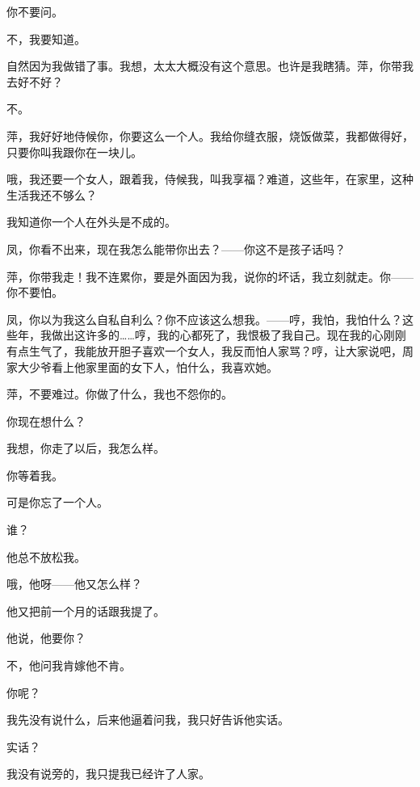 你不要问。

不，我要知道。

自然因为我做错了事。我想，太太大概没有这个意思。也许是我瞎猜。萍，你带我去好不好？

不。

萍，我好好地侍候你，你要这么一个人。我给你缝衣服，烧饭做菜，我都做得好，只要你叫我跟你在一块儿。

哦，我还要一个女人，跟着我，侍候我，叫我享福？难道，这些年，在家里，这种生活我还不够么？

我知道你一个人在外头是不成的。

凤，你看不出来，现在我怎么能带你出去？——你这不是孩子话吗？

萍，你带我走！我不连累你，要是外面因为我，说你的坏话，我立刻就走。你——你不要怕。

凤，你以为我这么自私自利么？你不应该这么想我。——哼，我怕，我怕什么？这些年，我做出这许多的……哼，我的心都死了，我恨极了我自己。现在我的心刚刚有点生气了，我能放开胆子喜欢一个女人，我反而怕人家骂？哼，让大家说吧，周家大少爷看上他家里面的女下人，怕什么，我喜欢她。

萍，不要难过。你做了什么，我也不怨你的。

你现在想什么？

我想，你走了以后，我怎么样。

你等着我。

可是你忘了一个人。

谁？

他总不放松我。

哦，他呀——他又怎么样？

他又把前一个月的话跟我提了。

他说，他要你？

不，他问我肯嫁他不肯。

你呢？

我先没有说什么，后来他逼着问我，我只好告诉他实话。

实话？

我没有说旁的，我只提我已经许了人家。

